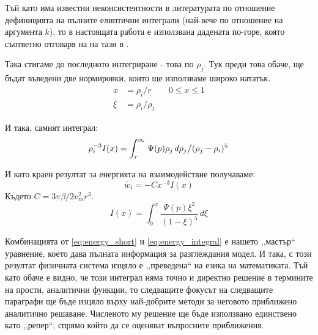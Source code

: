 Тъй като има известни неконсистентности в литературата по отношение дефиницията на пълните елиптични интеграли (най-вече по отношение на аргумента $k$), то в настоящата работа е използвана дадената по-горе, която съответно отговаря на на тази в \cite{gradshteyn}.

Така стигаме до последното интегриране - това по $\rho_j$. Тук преди това обаче, ще бъдат въведени две нормировки, които ще използваме широко нататък.
\begin{align*}
	x & = \rho_i/r &   & 0 \le x \le 1 \\
	\xi &= \rho_i/\rho_j
\end{align*}

И така, самият интеграл:
\begin{equation*}
	\rho_{i}^{-3} I(x) = \displaystyle\int_{r}^{\infty} \left. \Psi(p)\rho_j \,d\rho_j \middle/ (\rho_j-\rho_i)^5 \right.
\end{equation*}

И като краен резултат за енергията на взаимодействие получаваме:
\begin{equation}
	\tilde{w_i} = -C x^{-3} I(x) 
	\label{eq:energy_short}
\end{equation}
Където $ C = 3 \pi \beta / 2 v_{m}^2 r^3 $.
\begin{equation}
	I(x) = \displaystyle\int_{0}^{x} \frac{\Psi(p) \xi^2}{(1-\xi)^5}  \,d\xi
	\label{eq:energy_integral}
\end{equation}

Комбинацията от \autoref{eq:energy_short} и \autoref{eq:energy_integral} е нашето ,,мастър`` уравнение, което дава пълната информация за разглеждания модел.
И така, с този резултат физичната система изцяло е ,,преведена`` на езика на математиката. Тъй като обаче е видно, че този интеграл няма точно и директно решение в термините на прости, 
аналитични функции, то следващите фокусът на следващите параграфи ще бъде изцяло върху най-добрите методи за неговото приближено аналитично решаване. Численото му решение ще бъде използвано
единствено като ,,репер``, спрямо който да се оценяват въпросните приближения.

